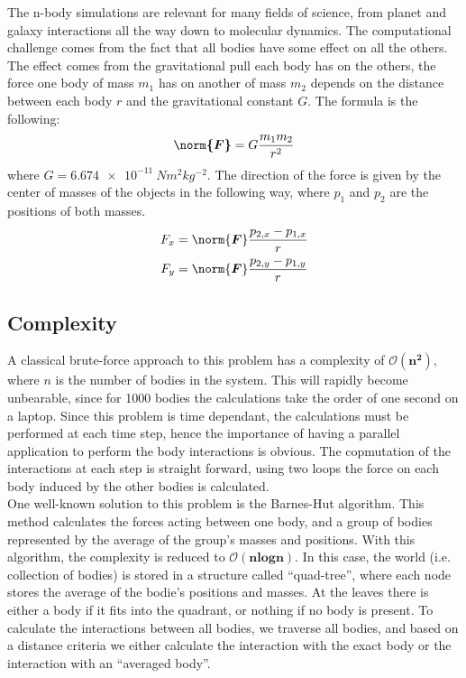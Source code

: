 The n-body simulations are relevant for many fields of science, from planet and galaxy interactions all the way down to molecular dynamics. The computational challenge comes from the fact that all bodies have some effect on all the others. The effect comes from the gravitational pull each body has on the others, the force one body of mass $m_1$ has on another of mass $m_2$ depends on the distance between each body $r$ and the gravitational constant $G$. The formula is the following:
\[\boldsymbol{\norm{F}} = G\frac{m_1m_2}{r^2}\]
where $G=\SI{6.674e-11}{Nm^{2}kg^{-2}}$. The direction of the force is given by the center of masses of the objects in the following way, where $p_1$ and $p_2$ are the positions of both masses. 
\begin{align*}
F_x &= \norm{\boldsymbol{F}}\frac{p_{2,x}-p_{1,x}}{r}\\
F_y &= \norm{\boldsymbol{F}}\frac{p_{2,y}-p_{1,y}}{r}
\end{align*}
\subsection{Complexity}
A classical brute-force approach to this problem has a complexity of $\boldsymbol{\mathcal{O}(n^2)}$, where $n$ is the number of bodies in the system. This will rapidly become unbearable, since for 1000 bodies the calculations take the order of one second on a laptop. Since this problem is time dependant, the calculations must be performed at each time step, hence the importance of having a parallel application to perform the body interactions is obvious. The copmutation of the interactions at each step is straight forward, using two loops the force on each body induced by the other bodies is calculated.\\
One well-known solution to this problem is the Barnes-Hut algorithm. This method calculates the forces acting between one body, and a group of bodies represented by the average of the group's masses and positions. With this algorithm, the complexity is reduced to $\boldsymbol{\mathcal{O}(nlogn)}$. In this case, the world (i.e. collection of bodies) is stored in a structure called ``quad-tree'', where each node stores the average of the bodie's positions and masses. At the leaves there is either a body if it fits into the quadrant, or nothing if no body is present. To calculate the interactions between all bodies, we traverse all bodies, and based on a distance criteria we either calculate the interaction with the exact body or the interaction with an ``averaged body''. 

